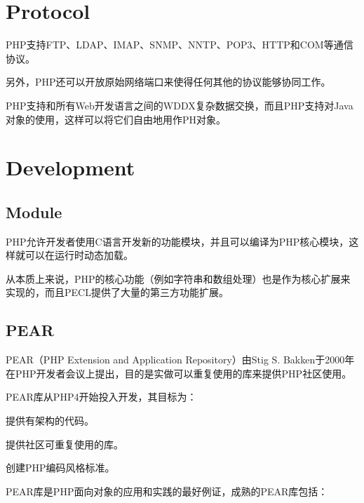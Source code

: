 \chapter{Protocol}

PHP支持FTP、LDAP、IMAP、SNMP、NNTP、POP3、HTTP和COM等通信协议。

另外，PHP还可以开放原始网络端口来使得任何其他的协议能够协同工作。

PHP支持和所有Web开发语言之间的WDDX复杂数据交换，而且PHP支持对Java对象的使用，这样可以将它们自由地用作PH对象。







\chapter{Development}

\section{Module}


PHP允许开发者使用C语言开发新的功能模块，并且可以编译为PHP核心模块，这样就可以在运行时动态加载。

从本质上来说，PHP的核心功能（例如字符串和数组处理）也是作为核心扩展来实现的，而且PECL提供了大量的第三方功能扩展。



\section{PEAR}


PEAR（PHP Extension and Application Repository）由Stig S. Bakken于2000年在PHP开发者会议上提出，目的是实做可以重复使用的库来提供PHP社区使用。

PEAR库从PHP4开始投入开发，其目标为：

\begin{compactitem}
\item 提供有架构的代码。
\item 提供社区可重复使用的库。
\item 创建PHP编码风格标准。
\end{compactitem}

PEAR库是PHP面向对象的应用和实践的最好例证，成熟的PEAR库包括：

